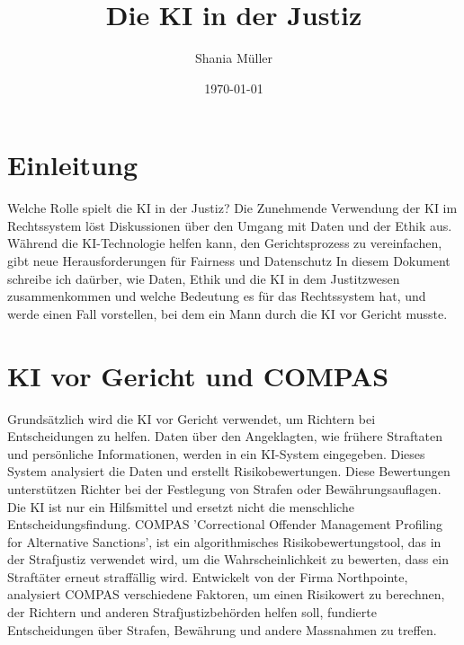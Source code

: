 \documentclass{article}
\title{Die KI in der Justiz}
\author{Shania Müller}
\date{\today}
\begin{document}
\maketitle


\tableofcontents


\newpage
\section {Einleitung}

Welche Rolle spielt die KI in der Justiz?  
Die Zunehmende Verwendung der KI im Rechtssystem löst Diskussionen über den 
Umgang mit Daten und der Ethik aus. Während die KI-Technologie helfen kann, den
Gerichtsprozess zu vereinfachen, gibt neue Herausforderungen für Fairness und Datenschutz
In diesem Dokument schreibe ich daürber, wie Daten, Ethik und die KI in dem Justitzwesen
zusammenkommen und welche Bedeutung es für das Rechtssystem hat, und werde einen Fall vorstellen, 
bei dem ein Mann durch die KI vor Gericht musste. 

\section {KI vor Gericht und COMPAS}

Grundsätzlich wird die KI vor Gericht verwendet, um Richtern bei Entscheidungen zu helfen. 
Daten über den Angeklagten, wie frühere Straftaten und persönliche Informationen, werden in ein 
KI-System eingegeben. Dieses System analysiert die Daten und erstellt Risikobewertungen.
Diese Bewertungen unterstützen Richter bei der Festlegung von Strafen oder Bewährungsauflagen. 
Die KI ist nur ein Hilfsmittel und ersetzt nicht die menschliche Entscheidungsfindung.
\newline COMPAS 'Correctional Offender Management Profiling for Alternative Sanctions', ist ein 
algorithmisches Risikobewertungstool, das in der Strafjustiz verwendet wird, um die 
Wahrscheinlichkeit zu bewerten, dass ein Straftäter erneut straffällig wird.
Entwickelt von der Firma Northpointe, analysiert COMPAS verschiedene Faktoren, um 
einen Risikowert zu berechnen, der Richtern und anderen 
Strafjustizbehörden helfen soll, fundierte Entscheidungen über Strafen, Bewährung und andere 
Massnahmen zu treffen.
\end{document}
